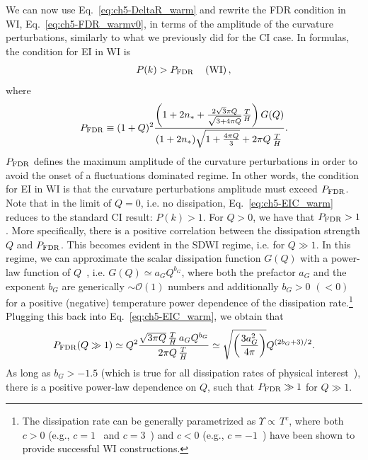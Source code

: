  We can now use Eq.~\ref{eq:ch5-DeltaR_warm} and rewrite the FDR condition in WI, Eq.~\ref{eq:ch5-FDR_warmv0}, in terms of the amplitude of the curvature perturbations, similarly to what we previously did for the CI case. In formulas, the condition for EI in WI is
%
\begin{eqnarray}
    P(k)> P_{\rm{FDR}} \,\,\,\,\,\,\,   ({\rm
 WI}) \, ,\label{eq:ch5-EIC_warm}
\end{eqnarray}
where
\begin{eqnarray}
    P_{\rm{FDR}}\equiv (1+Q)^2\frac{\left(1 + 2 n_{*}+\frac{2 \sqrt{3}
        \pi Q}{\sqrt{3+4 \pi Q}}
      \frac{T}{H}\right)G(Q)}{(1+2n_*)\sqrt{1+\frac{4\pi Q}{3}}+2\pi Q\,\frac{T}{H}\, }. \label{eq:ch5-P_FDR}
\end{eqnarray}
$P_{\rm{FDR}}$ defines the maximum amplitude of the curvature perturbations in order to avoid the onset of a fluctuations dominated regime. In other words, the condition for EI in WI is that the curvature perturbations amplitude must
exceed $P_{\rm{FDR}}$.
Note that in the limit of $Q=0$, i.e. no dissipation,
Eq.~\ref{eq:ch5-EIC_warm} reduces to the standard CI result: $P(k)>1$. For $Q>0$, we have that $P_{\rm{FDR}}>1$. More specifically, there
is a positive correlation between the dissipation strength $Q$ and
$P_{\rm{FDR}}$. This becomes evident in the SDWI regime, i.e. for
$Q\gg 1$. In this regime, we can approximate the scalar dissipation
function  $G(Q)$ with a power-law function of
$Q$~\cite{Montefalcone:2023pvh}, i.e.  $G(Q)\simeq a_G Q^{b_G}$, where both
the prefactor $a_G$ and the exponent $b_G$ are generically $\sim \mathcal{O}(1)$ numbers and additionally $b_G>0$ $(<0)$ for a positive (negative) temperature power
dependence of the dissipation rate.\footnote{The dissipation rate can be
generally parametrized as $\Upsilon\propto\,T^c$, where both $c>0$ (e.g.,
$c=1$~\cite{Bastero-Gil:2016qru} and $c=3$~\cite{Moss:2006gt}) and
$c<0$ (e.g., $c=-1$~\cite{Bastero-Gil:2019gao}) have been shown to
provide successful WI constructions.} Plugging this back into
Eq.~\ref{eq:ch5-EIC_warm}, we obtain that
%
\begin{equation}
    P_{\rm{FDR}}(Q\gg 1)\simeq Q^2\frac{\sqrt{3\pi
        Q}\,\frac{T}{H}\,a_G Q^{b_G}}{2\pi Q
     \,\frac{T}{H}\,}  \simeq
    \sqrt{\left(\frac{3a_G^2}{4\pi}\right)}Q^{(2b_G+3)/2}.
    \label{eq:ch5-EIC_SDwarm}
\end{equation}
%
As long as $b_G>-1.5$ (which is true for all dissipation rates of
physical interest~\cite{Montefalcone:2023pvh}), there is a positive
power-law dependence on $Q$, such that $P_{\rm{FDR}}\gg1$ for $Q\gg
1$.


